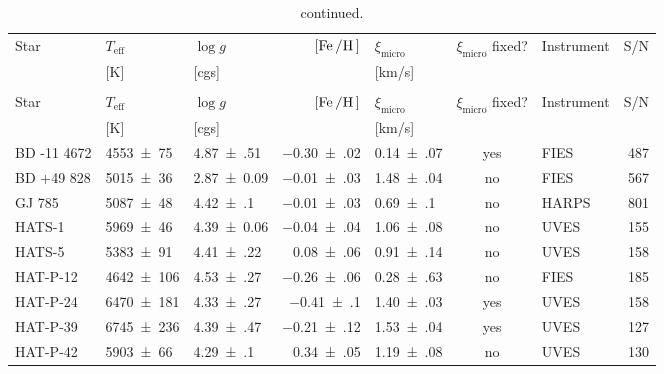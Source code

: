 \documentclass[fleqn]{fcup-thesis}
\newcommand{\object}[1]{#1}
\DeclareRobustCommand{\ion}[2]{\textup{#1\,\textsc{\lowercase{#2}}}}
\begin{document}
\begin{landscape}
\begin{ThreePartTable}
\begin{longtable}{lllrlclr}
   \hline\hline
   Star  & $T_\mathrm{eff}$ & $\log g$ & $[\ion{Fe}/\ion{H}]$ &  $\xi_\mathrm{micro}$ &  $\xi_\mathrm{micro}$ fixed?  &  Instrument  &  S/N  \\[-0.3em]
         &       [K]        &  [cgs]   &                      &     [km/s]            &                               &              &       \\
   \hline
   \endfirsthead
   \caption{continued.}\\
   \hline\hline
   Star  & $T_\mathrm{eff}$ & $\log g$ & $[\ion{Fe}/\ion{H}]$ &  $\xi_\mathrm{micro}$ &  $\xi_\mathrm{micro}$ fixed?  &  Instrument  &  S/N  \\[-0.3em]
         &       [K]        &  [cgs]   &                      &     [km/s]            &                               &              &       \\
   \hline
   \endhead
   \hline
   \endfoot
   \endlastfoot
   \hline
        \object{BD -11 4672}    &   \num{4553(75)}    &  \num{4.87(51)}             &  \num{-0.30(02)}  &  \num{0.14(07)}  & yes  &  FIES             &  487  \\
        \object{BD +49  828}    &   \num{5015(36)}    &  \num{2.87(9)}\tnote{a}     &  \num{-0.01(03)}  &  \num{1.48(04)}  & no   &  FIES             &  567  \\
        \object{GJ 785}         &   \num{5087(48)}    &  \num{4.42(10)}             &  \num{-0.01(03)}  &  \num{0.69(10)}  & no   &  HARPS            &  801  \\
        \object{HATS-1}         &   \num{5969(46)}    &  \num{4.39(6)}              &  \num{-0.04(04)}  &  \num{1.06(08)}  & no   &  UVES             &  155  \\
        \object{HATS-5}         &   \num{5383(91)}    &  \num{4.41(22)}             &  \num{ 0.08(06)}  &  \num{0.91(14)}  & no   &  UVES             &  158  \\
        \object{HAT-P-12}       &   \num{4642(106)}   &  \num{4.53(27)}             &  \num{-0.26(06)}  &  \num{0.28(63)}  & no   &  FIES             &  185  \\
        \object{HAT-P-24}       &   \num{6470(181)}   &  \num{4.33(27)}             &  \num{-0.41(10)}  &  \num{1.40(03)}  & yes  &  UVES             &  158  \\
        \object{HAT-P-39}       &   \num{6745(236)}   &  \num{4.39(47)}             &  \num{-0.21(12)}  &  \num{1.53(04)}  & yes  &  UVES             &  127  \\
        \object{HAT-P-42}       &   \num{5903(66)}    &  \num{4.29(10)}\tnote{a}    &  \num{ 0.34(05)}  &  \num{1.19(08)}  & no   &  UVES             &  130  \\

\end{longtable}
\end{ThreePartTable}
\end{landscape}
\end{document}
